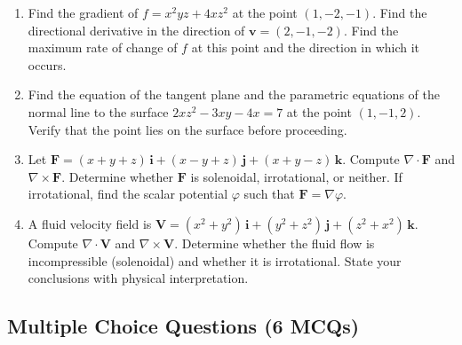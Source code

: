 \documentclass[12pt,a4paper]{article}
\begin{document}
\begin{enumerate}[leftmargin=*, label=\textbf{Problem \arabic*.}]
  \item Find the gradient of $f = x^2 yz + 4xz^2$ at the point $(1, -2, -1)$. Find the directional derivative in the direction of $\mathbf{v} = (2, -1, -2)$. Find the maximum rate of change of $f$ at this point and the direction in which it occurs.

  \item Find the equation of the tangent plane and the parametric equations of the normal line to the surface $2xz^2 - 3xy - 4x = 7$ at the point $(1, -1, 2)$. Verify that the point lies on the surface before proceeding.

  \item Let $\mathbf{F} = (x+y+z)\,\mathbf{i} + (x-y+z)\,\mathbf{j} + (x+y-z)\,\mathbf{k}$. Compute $\nabla \cdot \mathbf{F}$ and $\nabla \times \mathbf{F}$. Determine whether $\mathbf{F}$ is solenoidal, irrotational, or neither. If irrotational, find the scalar potential $\varphi$ such that $\mathbf{F} = \nabla \varphi$.

  \item A fluid velocity field is $\mathbf{V} = (x^2 + y^2)\,\mathbf{i} + (y^2 + z^2)\,\mathbf{j} + (z^2 + x^2)\,\mathbf{k}$. Compute $\nabla \cdot \mathbf{V}$ and $\nabla \times \mathbf{V}$. Determine whether the fluid flow is incompressible (solenoidal) and whether it is irrotational. State your conclusions with physical interpretation.
\end{enumerate}

\subsection*{Multiple Choice Questions (6 MCQs)}
\end{document}
